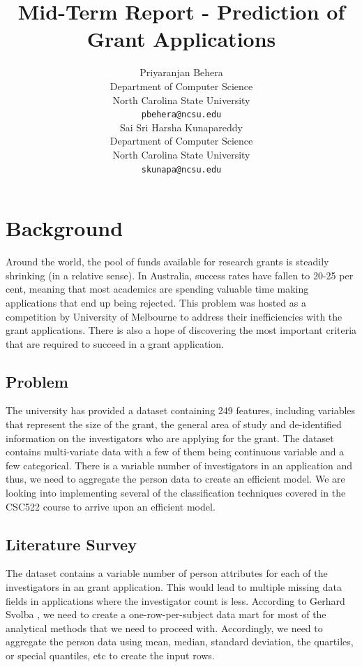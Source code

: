 \documentclass{article} %
\title{Mid-Term Report - Prediction of Grant Applications}
\author{
Priyaranjan Behera\\
Department of Computer Science\\
North Carolina State University\\
\texttt{pbehera@ncsu.edu} \\
\And
Sai Sri Harsha Kunapareddy\\
Department of Computer Science\\
North Carolina State University\\
\texttt{skunapa@ncsu.edu} \\
}
\begin{document}
\maketitle

\section{Background}

Around the world, the pool of funds available for research grants is steadily shrinking (in a relative sense). In Australia, success rates have fallen to 20-25 per cent, meaning that most academics are spending valuable time making applications that end up being rejected. This problem was hosted as a competition by University of Melbourne to address their inefficiencies with the grant applications. There is also a hope of discovering the most important criteria that are required to succeed in a grant application. 

\subsection{Problem}

The university has provided a dataset containing 249 features, including variables that represent the size of the grant, the general area of study and de-identified information on the investigators who are applying for the grant. The dataset contains multi-variate data with a few of them being continuous variable and a few categorical. There is a variable number of investigators in an application and thus, we need to aggregate the person data to create an efficient model. We are looking into implementing several of the classification techniques covered in the CSC522 course to arrive upon an efficient model.


\subsection{Literature Survey}

The dataset contains a variable number of person attributes for each of the investigators in an grant application. This would lead to multiple missing data fields in applications where the investigator count is less. According to Gerhard Svolba \cite{OneRow}, we need to create a one-row-per-subject data mart for most of the analytical methods that we need to proceed with. Accordingly, we need to aggregate the person data using mean, median, standard deviation, the quartiles, or special quantiles, etc to create the input rows.
\end{document}
